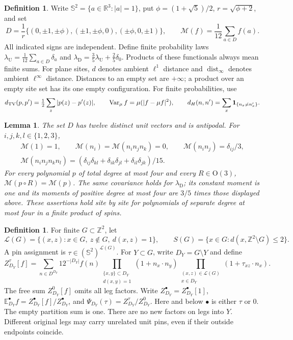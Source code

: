 \documentclass[11pt,reqno]{amsart}
\newtheorem{lemma}[theorem]{Lemma}
\theoremstyle{definition}
\newtheorem{definition}[theorem]{Definition}
\theoremstyle{remark}
\begin{document}
\begin{definition}\label{d:moment}
Write \(\mathbb S^2=\{a\in\mathbb R^3:|a|=1\}\), put
\(\phi=(1+\sqrt5)/2\), \(r=\sqrt{\phi+2}\), and set
\[
 D=\frac1r\{(0,\pm1,\pm\phi),(\pm1,\pm\phi,0),(\pm\phi,0,\pm1)\},
 \qquad
 \mathcal M(f)=\frac1{12}\sum_{a\in D}f(a).
\]
All indicated signs are independent. Define finite probability laws
\(\lambda_{\mathrm U}=\frac1{12}\sum_{a\in D}\delta_a\) and
\(\lambda_{\mathrm D}=\frac35\lambda_{\mathrm U}+\frac25\delta_0\).
Products of these functionals always mean finite sums.
For plane sites, \(d\) denotes ambient \(\ell^1\) distance and
\(\operatorname{dist}_\infty\) denotes ambient \(\ell^\infty\) distance.
Distances to an empty set are \(+\infty\); a product over an empty site
set has its one empty configuration. For finite probabilities, use
\[
 d_{\rm TV}(p,p')=\tfrac12\sum_z|p(z)-p'(z)|,\qquad
 \operatorname{Var}_\mu f=\mu(|f-\mu f|^2),\qquad
 d_H(n,n')=\sum_x\mathbf1_{\{n_x\ne n'_x\}} .
\]
\end{definition}

\begin{lemma}\label{l:moments}
The set \(D\) has twelve distinct unit vectors and is antipodal.
For \(i,j,k,l\in\{1,2,3\}\),
\[
 \begin{gathered}
 \mathcal M(1)=1,\qquad \mathcal M(n_i)=\mathcal M(n_in_jn_k)=0,\qquad
 \mathcal M(n_in_j)=\delta_{ij}/3,\\
 \mathcal M(n_in_jn_kn_l)=
 (\delta_{ij}\delta_{kl}+\delta_{ik}\delta_{jl}+\delta_{il}\delta_{jk})/15.
 \end{gathered}
\]
For every polynomial \(p\) of total degree at most four and every
\(R\in\mathrm O(3)\), \(\mathcal M(p\circ R)=\mathcal M(p)\).
The same covariance holds for \(\lambda_{\mathrm D}\); its constant
moment is one and its moments of positive degree at most four are
\(3/5\) times those displayed above.
These assertions hold site by site for polynomials of separate degree
at most four in a finite product of spins.
\end{lemma}

\begin{definition}\label{d:pinmodel}
For finite \(G\subset\mathbb Z^2\), let
\[
 \mathcal L(G)=\{(x,z):x\in G,\ z\notin G,\ d(x,z)=1\},\qquad
 S(G)=\{x\in G:d(x,\mathbb Z^2\setminus G)\le2\}.
\]
A pin assignment is \(\tau\in(\mathbb S^2)^{\mathcal L(G)}\).
For \(Y\subset G\), write \(D_Y=G\setminus Y\) and define
\[
 Z^\tau_{D_Y}[f]=
 \sum_{n\in D^{D_Y}}12^{-|D_Y|}f(n)
 \prod_{\substack{\{x,y\}\subset D_Y\\d(x,y)=1}}(1+n_x\cdot n_y)
 \prod_{\substack{(x,z)\in\mathcal L(G)\\x\in D_Y}}
       (1+\tau_{xz}\cdot n_x).
\]
The free sum \(Z^0_{D_Y}[f]\) omits all leg factors.
Write \(Z^\bullet_{D_Y}=Z^\bullet_{D_Y}[1]\),
\(\mathbb E^\bullet_{D_Y}f=Z^\bullet_{D_Y}[f]/Z^\bullet_{D_Y}\),
and \(\Psi_{D_Y}(\tau)=Z^\tau_{D_Y}/Z^0_{D_Y}\).
Here and below \(\bullet\) is either \(\tau\) or \(0\).
The empty partition sum is one. There are no new factors on legs into \(Y\).
Different original legs may carry unrelated unit pins, even if their
outside endpoints coincide.
\end{definition}
\end{document}
